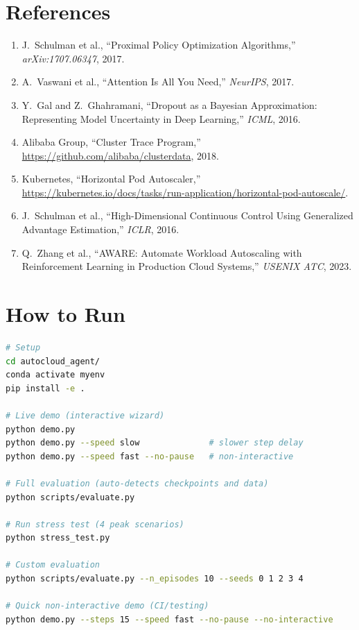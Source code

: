 \documentclass[11pt,a4paper]{article}
\begin{document}
\section{References}\label{sec:references}


\begin{enumerate}[leftmargin=2em]
  \item J.~Schulman et al., ``Proximal Policy Optimization Algorithms,''
        \textit{arXiv:1707.06347}, 2017.
  \item A.~Vaswani et al., ``Attention Is All You Need,''
        \textit{NeurIPS}, 2017.
  \item Y.~Gal and Z.~Ghahramani, ``Dropout as a Bayesian Approximation:
        Representing Model Uncertainty in Deep Learning,''
        \textit{ICML}, 2016.
  \item Alibaba Group, ``Cluster Trace Program,''
        \url{https://github.com/alibaba/clusterdata}, 2018.
  \item Kubernetes, ``Horizontal Pod Autoscaler,''
        \url{https://kubernetes.io/docs/tasks/run-application/horizontal-pod-autoscale/}.
  \item J.~Schulman et al., ``High-Dimensional Continuous Control Using
        Generalized Advantage Estimation,'' \textit{ICLR}, 2016.
  \item Q.~Zhang et al., ``AWARE: Automate Workload Autoscaling with
        Reinforcement Learning in Production Cloud Systems,''
        \textit{USENIX ATC}, 2023.
\end{enumerate}


\section{How to Run}


\begin{lstlisting}[language=bash]
# Setup
cd autocloud_agent/
conda activate myenv
pip install -e .

# Live demo (interactive wizard)
python demo.py
python demo.py --speed slow              # slower step delay
python demo.py --speed fast --no-pause   # non-interactive

# Full evaluation (auto-detects checkpoints and data)
python scripts/evaluate.py

# Run stress test (4 peak scenarios)
python stress_test.py

# Custom evaluation
python scripts/evaluate.py --n_episodes 10 --seeds 0 1 2 3 4

# Quick non-interactive demo (CI/testing)
python demo.py --steps 15 --speed fast --no-pause --no-interactive
\end{lstlisting}
\end{document}
